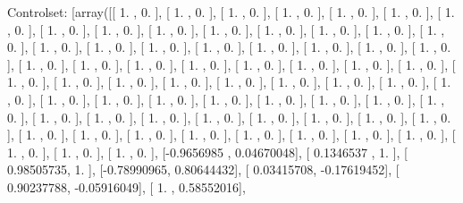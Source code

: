 \documentclass{article}
\begin{document}
Controlset: [array([[ 1.        ,  0.        ],
       [ 1.        ,  0.        ],
       [ 1.        ,  0.        ],
       [ 1.        ,  0.        ],
       [ 1.        ,  0.        ],
       [ 1.        ,  0.        ],
       [ 1.        ,  0.        ],
       [ 1.        ,  0.        ],
       [ 1.        ,  0.        ],
       [ 1.        ,  0.        ],
       [ 1.        ,  0.        ],
       [ 1.        ,  0.        ],
       [ 1.        ,  0.        ],
       [ 1.        ,  0.        ],
       [ 1.        ,  0.        ],
       [ 1.        ,  0.        ],
       [ 1.        ,  0.        ],
       [ 1.        ,  0.        ],
       [ 1.        ,  0.        ],
       [ 1.        ,  0.        ],
       [ 1.        ,  0.        ],
       [ 1.        ,  0.        ],
       [ 1.        ,  0.        ],
       [ 1.        ,  0.        ],
       [ 1.        ,  0.        ],
       [ 1.        ,  0.        ],
       [ 1.        ,  0.        ],
       [ 1.        ,  0.        ],
       [ 1.        ,  0.        ],
       [ 1.        ,  0.        ],
       [ 1.        ,  0.        ],
       [ 1.        ,  0.        ],
       [ 1.        ,  0.        ],
       [ 1.        ,  0.        ],
       [ 1.        ,  0.        ],
       [ 1.        ,  0.        ],
       [ 1.        ,  0.        ],
       [ 1.        ,  0.        ],
       [ 1.        ,  0.        ],
       [ 1.        ,  0.        ],
       [ 1.        ,  0.        ],
       [ 1.        ,  0.        ],
       [ 1.        ,  0.        ],
       [ 1.        ,  0.        ],
       [ 1.        ,  0.        ],
       [ 1.        ,  0.        ],
       [ 1.        ,  0.        ],
       [ 1.        ,  0.        ],
       [ 1.        ,  0.        ],
       [ 1.        ,  0.        ],
       [ 1.        ,  0.        ],
       [ 1.        ,  0.        ],
       [ 1.        ,  0.        ],
       [ 1.        ,  0.        ],
       [ 1.        ,  0.        ],
       [ 1.        ,  0.        ],
       [ 1.        ,  0.        ],
       [ 1.        ,  0.        ],
       [ 1.        ,  0.        ],
       [ 1.        ,  0.        ],
       [ 1.        ,  0.        ],
       [ 1.        ,  0.        ],
       [ 1.        ,  0.        ],
       [ 1.        ,  0.        ],
       [ 1.        ,  0.        ],
       [ 1.        ,  0.        ],
       [ 1.        ,  0.        ],
       [-0.9656985 ,  0.04670048],
       [ 0.1346537 ,  1.        ],
       [ 0.98505735,  1.        ],
       [-0.78990965,  0.80644432],
       [ 0.03415708, -0.17619452],
       [ 0.90237788, -0.05916049],
       [ 1.        ,  0.58552016],
\end{document}
